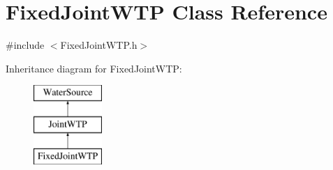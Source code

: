 \hypertarget{classFixedJointWTP}{}\section{Fixed\+Joint\+W\+TP Class Reference}
\label{classFixedJointWTP}


{\ttfamily \#include $<$Fixed\+Joint\+W\+T\+P.\+h$>$}

Inheritance diagram for Fixed\+Joint\+W\+TP\+:\begin{figure}[H]
\begin{center}
\leavevmode
\includegraphics[height=3.000000cm]{classFixedJointWTP}
\end{center}
\end{figure}
